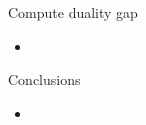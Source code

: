 \documentclass[first=dgreen,second=purple,logo=yellowexc]{aaltoslides}
\begin{document}
\begin{frame}{Compute duality gap}
	\begin{itemize}
		\item 
	\end{itemize}
\end{frame}










%
\begin{frame}{Conclusions}
	\begin{itemize}\footnotesize
		\item 
	\end{itemize}
\end{frame}




\iffalse
\begin{frame}[allowframebreaks]{Bibliography}
	
	
\end{frame}
\fi
\end{document}
